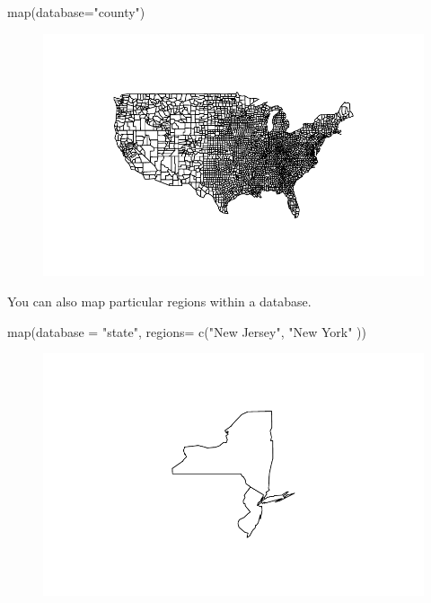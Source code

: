 \documentclass[
  letterpaper,
  DIV=11,
  numbers=noendperiod]{scrreprt}
\newenvironment{Shaded}{\begin{snugshade}}{\end{snugshade}}
\newcommand{\AttributeTok}[1]{\textcolor[rgb]{0.40,0.45,0.13}{#1}}
\newcommand{\FunctionTok}[1]{\textcolor[rgb]{0.28,0.35,0.67}{#1}}
\newcommand{\NormalTok}[1]{\textcolor[rgb]{0.00,0.23,0.31}{#1}}
\newcommand{\StringTok}[1]{\textcolor[rgb]{0.13,0.47,0.30}{#1}}
\begin{document}
\begin{Shaded}
\begin{Highlighting}[]
\FunctionTok{map}\NormalTok{(}\AttributeTok{database=}\StringTok{"county"}\NormalTok{)}
\end{Highlighting}
\end{Shaded}

\begin{figure}[H]

{\centering \includegraphics{12-Maps_files/figure-pdf/unnamed-chunk-6-1.pdf}

}

\end{figure}

You can also map particular regions within a database.

\begin{Shaded}
\begin{Highlighting}[]
\FunctionTok{map}\NormalTok{(}\AttributeTok{database =} \StringTok{"state"}\NormalTok{, }\AttributeTok{regions=} \FunctionTok{c}\NormalTok{(}\StringTok{"New Jersey"}\NormalTok{, }\StringTok{"New York"}\NormalTok{ ))}
\end{Highlighting}
\end{Shaded}

\begin{figure}[H]

{\centering \includegraphics{12-Maps_files/figure-pdf/unnamed-chunk-7-1.pdf}

}

\end{figure}
\end{document}
